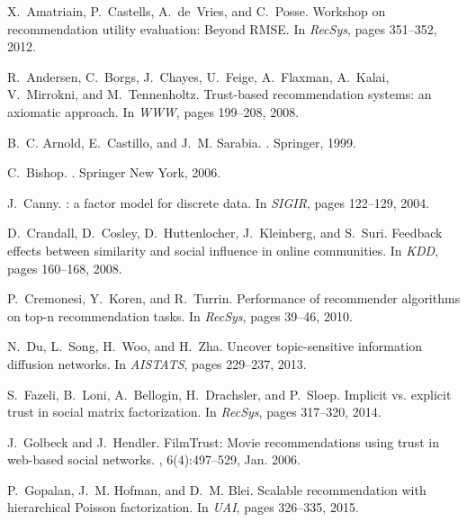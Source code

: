 \documentclass{sig-alternate-2013}
\begin{document}

\begin{thebibliography}{10}

X.~Amatriain, P.~Castells, A.~de~Vries, and C.~Posse.
\newblock Workshop on recommendation utility evaluation: Beyond {RMSE}.
\newblock In {\em RecSys}, pages 351--352, 2012.

R.~Andersen, C.~Borgs, J.~Chayes, U.~Feige, A.~Flaxman, A.~Kalai, V.~Mirrokni,
  and M.~Tennenholtz.
\newblock Trust-based recommendation systems: an axiomatic approach.
\newblock In {\em WWW}, pages 199--208, 2008.

B.~C. Arnold, E.~Castillo, and J.~M. Sarabia.
.
\newblock Springer, 1999.

C.~Bishop.
.
\newblock Springer New York, 2006.

J.~Canny.
: a factor model for discrete data.
\newblock In {\em SIGIR}, pages 122--129, 2004.

D.~Crandall, D.~Cosley, D.~Huttenlocher, J.~Kleinberg, and S.~Suri.
\newblock Feedback effects between similarity and social influence in online
  communities.
\newblock In {\em KDD}, pages 160--168, 2008.

P.~Cremonesi, Y.~Koren, and R.~Turrin.
\newblock Performance of recommender algorithms on top-n recommendation tasks.
\newblock In {\em RecSys}, pages 39--46, 2010.

N.~Du, L.~Song, H.~Woo, and H.~Zha.
\newblock Uncover topic-sensitive information diffusion networks.
\newblock In {\em {AISTATS}}, pages 229--237, 2013.

S.~Fazeli, B.~Loni, A.~Bellogin, H.~Drachsler, and P.~Sloep.
\newblock Implicit vs. explicit trust in social matrix factorization.
\newblock In {\em RecSys}, pages 317--320, 2014.

J.~Golbeck and J.~Hendler.
\newblock Film{T}rust: {M}ovie recommendations using trust in web-based social
  networks.
, 6(4):497--529, Jan. 2006.

P.~Gopalan, J.~M. Hofman, and D.~M. Blei.
\newblock Scalable recommendation with hierarchical {P}oisson factorization.
\newblock In {\em UAI}, pages 326--335, 2015.


\end{thebibliography}
\end{document}
